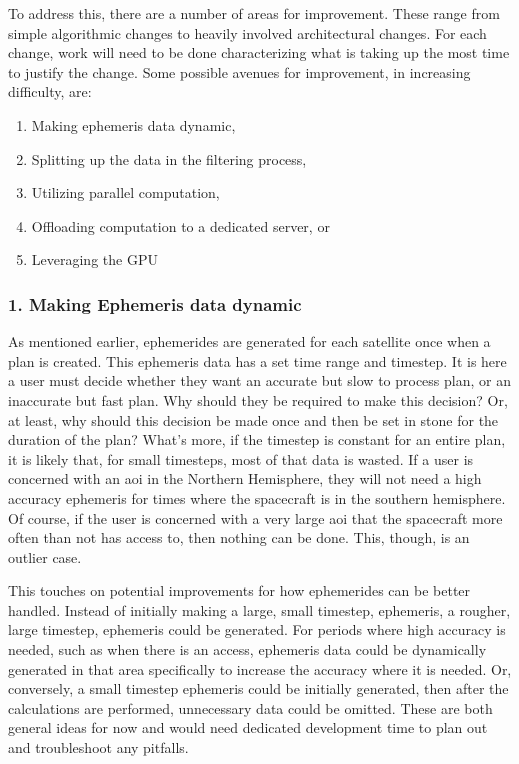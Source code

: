 To address this, there are a number of areas for improvement.  These range from
simple algorithmic changes to heavily involved architectural changes. For each
change, work will need to be done characterizing what is taking up the most
time to justify the change. Some possible avenues for improvement, in increasing
difficulty, are:

\begin{enumerate}
    \item Making ephemeris data dynamic,
    \item Splitting up the data in the filtering process,
    \item Utilizing parallel computation,
    \item Offloading computation to a dedicated server, or
    \item Leveraging the GPU
\end{enumerate}


\subsubsection{1. Making Ephemeris data dynamic}

As mentioned earlier, ephemerides are generated for each satellite once when a
plan is created. This ephemeris data has a set time range and timestep. It is
here a user must decide whether they want an accurate but slow to process plan,
or an inaccurate but fast plan. Why should they be required to make this
decision? Or, at least, why should this decision be made once and then be set
in stone for the duration of the plan? What's more, if the timestep is constant
for an entire plan, it is likely that, for small timesteps, most of that data
is wasted. If a user is concerned with an \gls{aoi} in the Northern Hemisphere,
they will not need a high accuracy ephemeris for times where the spacecraft is
in the southern hemisphere. Of course, if the user is concerned with a very
large \gls{aoi} that the spacecraft more often than not has access to, then
nothing can be done. This, though, is an outlier case.

This touches on potential improvements for how ephemerides can be better
handled.  Instead of initially making a large, small timestep, ephemeris, a
rougher, large timestep, ephemeris could be generated. For periods where high
accuracy is needed, such as when there is an access, ephemeris data could be
dynamically generated in that area specifically to increase the accuracy where
it is needed. Or, conversely, a small timestep ephemeris could be initially
generated, then after the calculations are performed, unnecessary data could be
omitted. These are both general ideas for now and would need dedicated
development time to plan out and troubleshoot any pitfalls.

